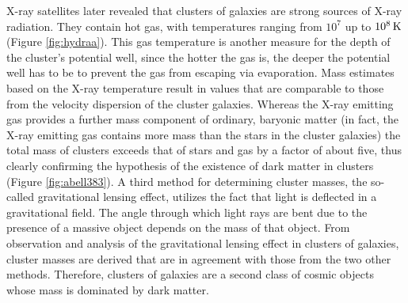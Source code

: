 \documentclass[a4paper,11pt]{article}
\begin{document}
{\noindent}X-ray satellites later revealed that clusters of galaxies are strong sources of X-ray radiation. They contain hot gas, with temperatures ranging from $10^7$ up to $10^8\,{\rm K}$ (Figure \ref{fig:hydraa}). This gas temperature is another measure for the depth of the cluster's potential well, since the hotter the gas is, the deeper the potential well has to be to prevent the gas from escaping via evaporation. Mass estimates based on the X-ray temperature result in values that are comparable to those from the velocity dispersion of the cluster galaxies. Whereas the X-ray emitting gas provides a further mass component of ordinary, baryonic matter (in fact, the X-ray emitting gas contains more mass than the stars in the cluster galaxies) the total mass of clusters exceeds that of stars and gas by a factor of about five, thus clearly confirming the hypothesis of the existence of dark matter in clusters (Figure \ref{fig:abell383}). A third method for determining cluster masses, the so-called gravitational lensing effect, utilizes the fact that light is deflected in a gravitational field. The angle through which light rays are bent due to the presence of a massive object depends on the mass of that object. From observation and analysis of the gravitational lensing effect in clusters of galaxies, cluster masses are derived that are in agreement with those from the two other methods. Therefore, clusters of galaxies are a second class of cosmic objects whose mass is dominated by dark matter.
\end{document}
